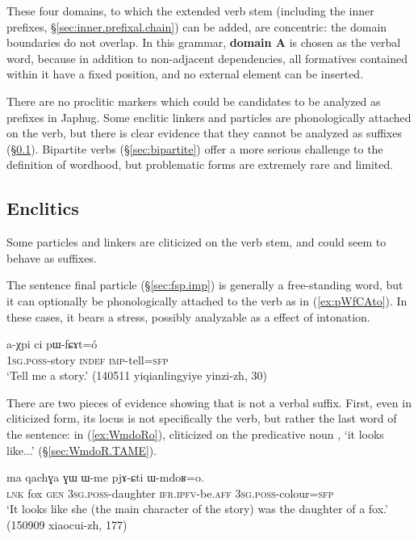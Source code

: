 These four domains, to which the extended verb stem (including the inner prefixes, §\ref{sec:inner.prefixal.chain}) can be added, are concentric: the domain boundaries do not overlap. In this grammar, \textbf{domain A} is chosen as the verbal word, because in addition to non-adjacent dependencies, all formatives contained within it have a fixed position, and no external element can be inserted. 

There are no proclitic markers which could be candidates to be analyzed as prefixes in Japhug. Some enclitic linkers and particles are phonologically attached on the verb, but there is clear evidence that they cannot be analyzed as suffixes (§\ref{sec:verb.enclitics}). Bipartite verbs (§\ref{sec:bipartite}) offer a more serious challenge to the definition of wordhood, but problematic forms are extremely rare and limited.

\subsection{Enclitics} \label{sec:verb.enclitics}
Some particles and linkers are cliticized on the verb stem, and could seem to behave as suffixes.

The sentence final particle  (§\ref{sec:fsp.imp}) is generally a free-standing word, but it can optionally be phonologically attached to the verb as in (\ref{ex:pWfCAto}). In these cases, it bears a stress, possibly analyzable as a effect of intonation.


\begin{exe}
\ex \label{ex:pWfCAto}
\gll a-χpi ci pɯ-fɕɤt=ó \\
\textsc{1sg}.\textsc{poss}-story \textsc{indef} \textsc{imp}-tell=\textsc{sfp} \\
\glt `Tell me a story.' (140511 yiqianlingyiye yinzi-zh, 30)
\end{exe}

There are two pieces of evidence showing that  is not a verbal suffix. First, even in cliticized form, its locus is not specifically the verb, but rather the last word of the sentence: in (\ref{ex:WmdoRo}),  cliticized on the predicative noun   , `it looks like...' (§\ref{sec:WmdoR.TAME}).

\begin{exe}
\ex \label{ex:WmdoRo}
\gll ma qachɣa ɣɯ ɯ-me pjɤ-ɕti ɯ-mdoʁ=o. \\
\textsc{lnk} fox \textsc{gen} \textsc{3sg}.\textsc{poss}-daughter \textsc{ifr}.\textsc{ipfv}-be.\textsc{aff} \textsc{3sg}.\textsc{poss}-colour=\textsc{sfp} \\
\glt `It looks like she (the main character of the story) was the daughter of a fox.' (150909 xiaocui-zh, 177)
\end{exe}

